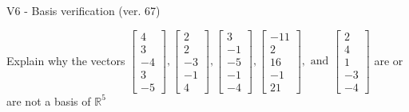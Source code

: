 \begin{exercise}
  \begin{exerciseTitle}V6 - Basis verification (ver. 67)\end{exerciseTitle}
  \begin{exerciseStatement}
    Explain why the vectors \(\left[\begin{array}{r}
4 \\
3 \\
-4 \\
3 \\
-5
\end{array}\right] , \left[\begin{array}{r}
2 \\
2 \\
-3 \\
-1 \\
4
\end{array}\right] , \left[\begin{array}{r}
3 \\
-1 \\
-5 \\
-1 \\
-4
\end{array}\right] , \left[\begin{array}{r}
-11 \\
2 \\
16 \\
-1 \\
21
\end{array}\right] , \text{ and } \left[\begin{array}{r}
2 \\
4 \\
1 \\
-3 \\
-4
\end{array}\right]\) are or are not a basis of \(\mathbb{R}^5\)	



\end{exerciseStatement}
\end{exercise}
